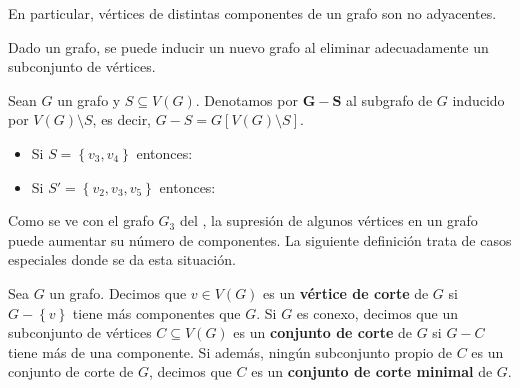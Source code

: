 \begin{Obs}\label{Obs:Componentes_no_adyacentes}
   En particular, vértices de distintas componentes de un grafo son no adyacentes. 
\end{Obs}
Dado un grafo, se puede inducir un nuevo grafo al eliminar adecuadamente un subconjunto de vértices.
\begin{Def}
   Sean $G$ un grafo y $S\subseteq V(G)$. Denotamos por $\bm{G-S}$ al subgrafo de $G$ inducido por $V(G)\setminus S$, es decir, $G-S=G[V(G)\setminus S]$. 
\end{Def}
\begin{Ejm}\label{Ejm:Supresion}
   \phantom{0}
   \begin{itemize}
      \item Si $S=\left\lbrace v_3,v_4\right\rbrace$ entonces:  
           
      \item Si $S'=\left\lbrace v_2,v_3,v_5\right\rbrace$ entonces:
         \vspace{1em}
           
   \end{itemize}
\end{Ejm}
Como se ve con el grafo $G_3$ del , la supresión de algunos vértices en un grafo puede aumentar su número de componentes. La siguiente definición trata de casos especiales donde se da esta situación.
\begin{Def}\label{Def:cortes}
   Sea $G$ un grafo. Decimos que $v\in V(G)$ es un \textbf{vértice de corte} de $G$ si $G-\left\lbrace v\right\rbrace$ tiene más componentes que $G$. Si $G$ es conexo, decimos que un subconjunto de vértices $C\subseteq V(G)$ es un \textbf{conjunto de corte} de $G$ si $G-C$ tiene más de una componente. Si además, ningún subconjunto propio de $C$ es un conjunto de corte de $G$, decimos que $C$ es un \textbf{conjunto de corte minimal} de $G$.  
\end{Def}
